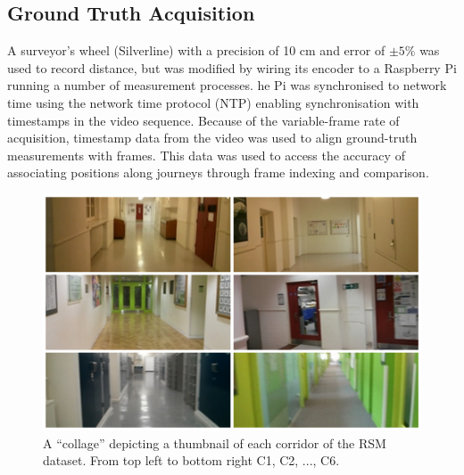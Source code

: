 \subsection{Ground Truth Acquisition}

A surveyor's wheel (Silverline) with a precision of 10 cm and error of $\pm 5\%$ was used to record distance, but was modified by wiring its encoder to a Raspberry Pi running a number of measurement processes. he Pi was synchronised to network time using the network time protocol (NTP) enabling synchronisation with timestamps in the video sequence.  Because of the variable-frame rate of acquisition, timestamp data from the video was used to align ground-truth measurements with frames. This data was used to access the accuracy of associating positions along journeys through frame indexing and comparison.


\begin{figure}[t]
\centering
\includegraphics[width=\linewidth]{./gfx/Chapter04/rsm_collage.jpg}
\caption{A ``collage'' depicting a thumbnail of each corridor of the RSM dataset. From top left to bottom right C1, C2, ..., C6.}
\label{fig:IsoPool}
\end{figure}



